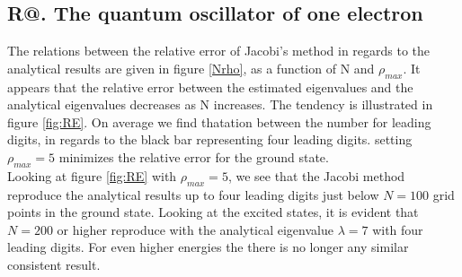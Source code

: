\documentclass[%
reprint,
amsmath, 
amssymb, 
aps,]{revtex4-1}
\makeatletter
\newcommand*{\rom}[1]{\expandafter\@slowromancap\romannumeral #1@}
\makeatother
\begin{document}
		\subsection*{R\rom{2}. The quantum oscillator of one electron} \noindent 
The relations between the relative error of Jacobi's method in regards to the analytical results are given in figure \ref{Nrho}, as a function of N and $\rho_{max}$. It appears that the relative error between the estimated eigenvalues and the analytical eigenvalues decreases as N increases. The tendency is illustrated in figure \ref{fig:RE}. On average we find thatation between the number for leading digits, in regards to the black bar representing four leading digits. setting $\rho_{max} = 5$ minimizes the relative error for the ground state. \\ \indent 
Looking at figure \ref{fig:RE} with $\rho_{max} = 5$, we see that the Jacobi method reproduce the analytical results up to four leading digits just below $N=100$ grid points in the ground state. Looking at the excited states, it is evident that $N=200$  or higher reproduce with the analytical eigenvalue $\lambda = 7$ with four leading digits. For even higher energies the there is no longer any similar consistent result. \\
\end{document}
